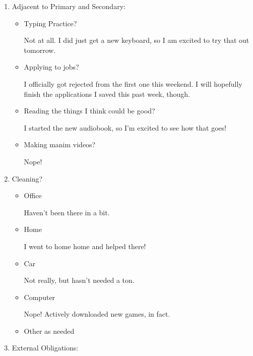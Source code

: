 \documentclass[12pt]{article}
\renewcommand{\,}{\textsuperscript{,}}
\begin{document}
\begin{enumerate}
\begin{itemize}
\begin{itemize}
\end{itemize}

\end{itemize}

\item Adjacent to Primary and Secondary:

\begin{itemize}

\item Typing Practice?

Not at all. I did just get a new keyboard, so I am excited to try that out tomorrow.

\item Applying to jobs?

I officially got rejected from the first one this weekend.  
I will hopefully finish the applications I saved this past week, though.

\item Reading the things I think could be good?

I started the new audiobook, so I'm excited to see how that goes!

\item Making manim videos?

Nope!

\end{itemize}

\item Cleaning?

\begin{itemize}

\item Office

Haven't been there in a bit.

\item Home

I went to home home and helped there!

\item Car

Not really, but hasn't needed a ton.

\item Computer

Nope! Actively downloaded new games, in fact.

\item Other as needed

\end{itemize}

\item External Obligations:

\begin{itemize}


\end{itemize}
\end{enumerate}
\end{document}
